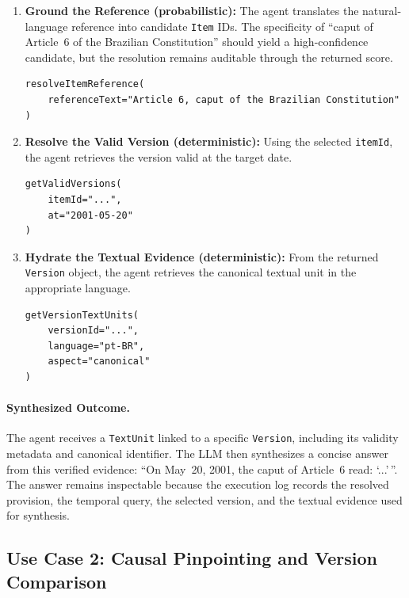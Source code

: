 \documentclass[11pt]{article}
\begin{document}
\begin{enumerate}[noitemsep, topsep=0pt]
    \item \textbf{Ground the Reference (probabilistic):} The agent translates the natural-language reference into candidate \texttt{Item} IDs. The specificity of ``caput of Article~6 of the Brazilian Constitution'' should yield a high-confidence candidate, but the resolution remains auditable through the returned score.
    \begin{lstlisting}[style=tablecode]
resolveItemReference(
    referenceText="Article 6, caput of the Brazilian Constitution"
)
    \end{lstlisting}

    \item \textbf{Resolve the Valid Version (deterministic):} Using the selected \texttt{itemId}, the agent retrieves the version valid at the target date.
    \begin{lstlisting}[style=tablecode]
getValidVersions(
    itemId="...",
    at="2001-05-20"
)
    \end{lstlisting}

    \item \textbf{Hydrate the Textual Evidence (deterministic):} From the returned \texttt{Version} object, the agent retrieves the canonical textual unit in the appropriate language.
    \begin{lstlisting}[style=tablecode]
getVersionTextUnits(
    versionId="...",
    language="pt-BR",
    aspect="canonical"
)
    \end{lstlisting}
\end{enumerate}

\paragraph{Synthesized Outcome.}
The agent receives a \texttt{TextUnit} linked to a specific \texttt{Version}, including its validity metadata and canonical identifier. The LLM then synthesizes a concise answer from this verified evidence: ``On May~20, 2001, the caput of Article~6 read: `...'\,''. The answer remains inspectable because the execution log records the resolved provision, the temporal query, the selected version, and the textual evidence used for synthesis.

\subsection{Use Case 2: Causal Pinpointing and Version Comparison}
\end{document}

